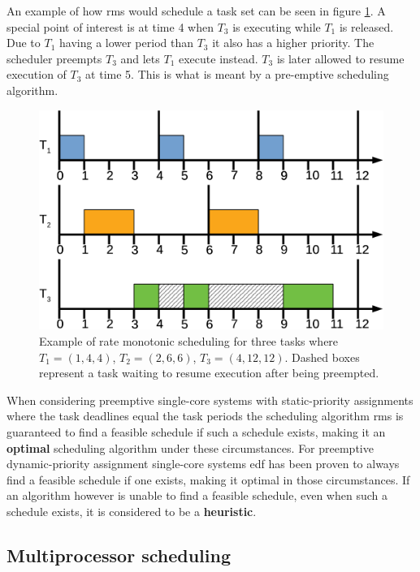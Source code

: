 \documentclass{kththesis}
\begin{document}
An example of how \acrshort{rms} would schedule a task set can be seen in figure
\ref{fig:rate_monotonic_scheduling}. A special point of interest is at time 4 when $T_3$ is
executing while $T_1$ is released. Due to $T_1$ having a lower period than $T_3$ it also has a
higher priority. The scheduler preempts $T_3$ and lets $T_1$ execute instead. $T_3$ is later allowed
to resume execution of $T_3$ at time 5. This is what is meant by a pre-emptive scheduling algorithm.

\begin{figure}

    \centering

    \includegraphics[width=0.8\linewidth]{images/rate-monotonic-scheduling.pdf}

    \caption{Example of rate monotonic scheduling for three tasks where $T_1=(1, 4, 4)$, $T_2=(2, 6,
    6)$, $T_3=(4, 12, 12)$. Dashed boxes represent a task waiting to resume execution after being
    preempted.} 

    \label{fig:rate_monotonic_scheduling}

\end{figure}

When considering preemptive single-core systems with static-priority assignments where the task
deadlines equal the task periods the scheduling algorithm \acrshort{rms} is guaranteed to find a
feasible schedule if such a schedule exists, making it an \textbf{optimal} scheduling algorithm
under these circumstances. For preemptive dynamic-priority assignment single-core systems
\acrshort{edf} has been proven to always find a feasible schedule if one exists, making it optimal
in those circumstances. If an algorithm however is unable to find a feasible schedule, even when
such a schedule exists, it is considered to be a \textbf{heuristic}.

\subsection{Multiprocessor scheduling} \label{subsec:multiprocessor_scheduling}
\end{document}
